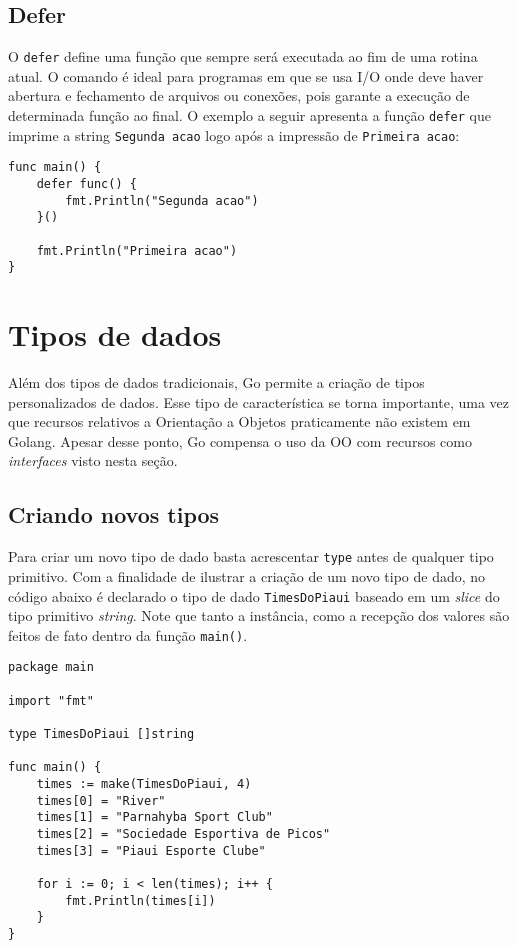 \documentclass{SBCbookchapter}
\begin{document}
\subsection{Defer}

O \texttt{defer} define uma função que sempre será executada ao fim de uma rotina atual. O comando é ideal para programas em que se usa I/O onde deve haver abertura e fechamento de arquivos ou conexões, pois garante a execução de determinada função ao final. O exemplo a seguir apresenta a função \texttt{defer} que imprime a string \texttt{Segunda acao} logo após a impressão de \texttt{Primeira acao}:

\begin{lstlisting}
func main() {
	defer func() {
		fmt.Println("Segunda acao")
	}()
	
	fmt.Println("Primeira acao")
}
\end{lstlisting}

\section{Tipos de dados}

Além dos tipos de dados tradicionais, Go permite a criação de tipos personalizados de dados. Esse tipo de característica se torna importante, uma vez que recursos relativos a Orientação a Objetos praticamente não existem em Golang. Apesar desse ponto, Go compensa o uso da OO com recursos como \textit{interfaces} visto nesta seção.

\subsection{Criando novos tipos}

Para criar um novo tipo de dado basta acrescentar \texttt{type} antes de qualquer tipo primitivo. Com a finalidade de ilustrar a criação de um novo tipo de dado, no código abaixo é declarado o tipo de dado \texttt{TimesDoPiaui} baseado em um \textit{slice} do tipo primitivo \textit{string}. Note que tanto a instância, como a recepção dos valores são feitos de fato dentro da função \texttt{main()}.

\begin{lstlisting}
package main

import "fmt"

type TimesDoPiaui []string

func main() {	
	times := make(TimesDoPiaui, 4)
	times[0] = "River"
	times[1] = "Parnahyba Sport Club"
	times[2] = "Sociedade Esportiva de Picos"
	times[3] = "Piaui Esporte Clube"
	
	for i := 0; i < len(times); i++ {
		fmt.Println(times[i])
	}	
}

\end{lstlisting}
\end{document}
